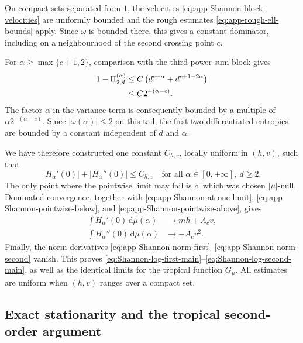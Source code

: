 \documentclass[aps,pra,11pt,onecolumn,nofootinbib,tightenlines]{revtex4-2}
\theoremstyle{definition}
\begin{document}
On compact sets separated from $1$, the velocities \eqref{eq:app-Shannon-block-velocities} are uniformly bounded and the rough estimates \eqref{eq:app-rough-ell-bounds} apply.  Since $\omega$ is bounded there, this gives a constant dominator, including on a neighbourhood of the second crossing point $c$.

For $\alpha\geq\max\{c+1,2\}$, comparison with the third power-sum block gives
\begin{align}
 1-\Pi_{2,d}^{(\alpha)}
 &\leq C\left(d^{c-\alpha}+d^{c+1-2\alpha}\right)
 \notag\\
 &\leq C2^{-(\alpha-c)}.
 \label{eq:app-Shannon-tail-weight}
\end{align}
The factor $\alpha$ in the variance term is consequently bounded by a multiple of $\alpha2^{-(\alpha-c)}$.  Since $|\omega(\alpha)|\leq2$ on this tail, the first two differentiated entropies are bounded by a constant independent of $d$ and $\alpha$.

We have therefore constructed one constant $C_{h,v}$, locally uniform in $(h,v)$, such that
\begin{equation}
 |H_\alpha'(0)|+|H_\alpha''(0)|\leq C_{h,v}
 \quad\text{for all }\alpha\in[0,+\infty],\ d\geq2.
 \label{eq:app-Shannon-global-dominator}
\end{equation}
The only point where the pointwise limit may fail is $c$, which was chosen $|\mu|$-null.  Dominated convergence, together with \eqref{eq:app-Shannon-at-one-limit}, \eqref{eq:app-Shannon-pointwise-below}, and \eqref{eq:app-Shannon-pointwise-above}, gives
\begin{align}
 \int H_\alpha'(0)\,\mathrm d\mu(\alpha)
 &\longrightarrow mh+A_cv,
 \label{eq:app-Shannon-integrated-first}\\
 \int H_\alpha''(0)\,\mathrm d\mu(\alpha)
 &\longrightarrow-A_cv^2.
 \label{eq:app-Shannon-integrated-second}
\end{align}
Finally, the norm derivatives \eqref{eq:app-Shannon-norm-first}--\eqref{eq:app-Shannon-norm-second} vanish.  This proves \eqref{eq:Shannon-log-first-main}--\eqref{eq:Shannon-log-second-main}, as well as the identical limits for the tropical function $G_\mu$.  All estimates are uniform when $(h,v)$ ranges over a compact set.

\subsection{Exact stationarity and the tropical second-order argument}
\label{app:tropical-stationarity}
\end{document}
